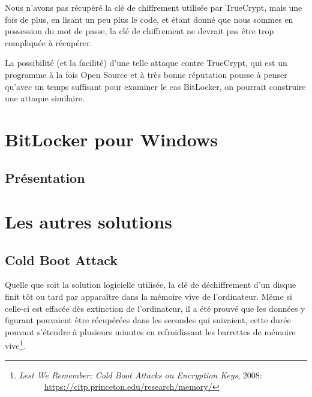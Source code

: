\documentclass[12pt,a4paper]{article}
\begin{document}
Nous n'avons pas récupéré la clé de chiffrement utilisée par TrueCrypt, mais une
fois de plus, en lisant un peu plus le code, et étant donné que nous sommes en 
possession du mot de passe, la clé de chiffrement ne devrait pas être trop 
compliquée à récupérer.

La possibilité (et la facilité) d'une telle attaque contre TrueCrypt, qui est un
programme à la fois Open Source et à très bonne réputation pousse à penser qu'avec
un temps suffisant pour examiner le cas BitLocker, on pourrait construire une
attaque similaire.


\section{BitLocker pour Windows}

\subsection{Présentation}



\section{Les autres solutions}

\subsection{Cold Boot Attack}

Quelle que soit la solution logicielle utilisée, la clé de déchiffrement d'un disque finit tôt ou tard par apparaître dans la mémoire vive de l'ordinateur. Même si celle-ci est effacée dès extinction de l'ordinateur, il a été prouvé que les données y figurant pouvaient être récupérées dans les secondes qui suivaient, cette durée pouvant s'étendre à plusieurs minutes en refroidissant les barrettes de mémoire vive\footnote{\textit{Lest We Remember: Cold Boot Attacks on Encryption Keys}, 2008:\\
~~~~~~\url{https://citp.princeton.edu/research/memory/}}.
\end{document}
